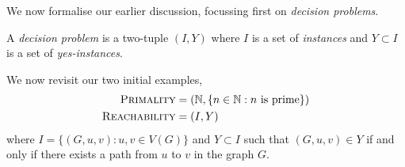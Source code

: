 We now formalise our earlier discussion, focussing first on \emph{decision problems}.

\begin{definition}
  A \emph{decision problem} is a two-tuple $(I, Y)$ where $I$ is a set of \emph{instances} and $Y \subset I$ is a set of \emph{yes-instances}. 
\end{definition}

We now revisit our two initial examples,
\begin{align*}
  \textsc{Primality} &= \left(\mathbb N, \{n \in \mathbb N: \text{$n$ is prime}\}\right) \\
  \textsc{Reachability} &= (I, Y)
\end{align*}
where $I = \{(G, u, v): u,v \in V(G)\}$ and $Y \subset I$ such that $(G,u,v) \in Y$ if and only if there exists a path from $u$ to $v$ in the graph $G$. 






